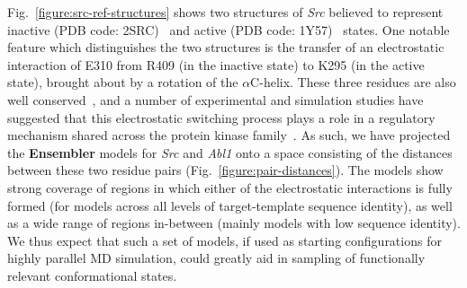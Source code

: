 \documentclass[aps,prl,preprint,nofootinbib,superscriptaddress,linenumbers]{revtex4-1}
\begin{document}
Fig.~\ref{figure:src-ref-structures} shows two structures of \emph{Src} believed to represent inactive (PDB code: 2SRC)~\cite{xu:1999:2src} and active (PDB code: 1Y57)~\cite{cowan-jacob:2005:1y57} states.
One notable feature which distinguishes the two structures is the transfer of an electrostatic interaction of E310 from R409 (in the inactive state) to K295 (in the active state), brought about by a rotation of the $\alpha$C-helix.
These three residues are also well conserved~\cite{kannan:jmb:2005:kinase-regulation}, and a number of experimental and simulation studies have suggested that this electrostatic switching process plays a role in a regulatory mechanism shared across the protein kinase family~\cite{shukla-pande:nature-commun:2014:src-activation-msm, foda:nat-comm:2015:src, ozkirimli:prot-sci:2008:src}.
As such, we have projected the {\bf Ensembler} models for \emph{Src} and \emph{Abl1} onto a space consisting of the distances between these two residue pairs (Fig.~\ref{figure:pair-distances}).
The models show strong coverage of regions in which either of the electrostatic interactions is fully formed (for models across all levels of target-template sequence identity), as well as a wide range of regions in-between (mainly models with low sequence identity).
We thus expect that such a set of models, if used as starting configurations for highly parallel MD simulation, could greatly aid in sampling of functionally relevant conformational states.

\end{document}
